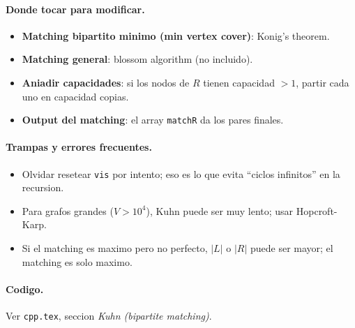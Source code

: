 \paragraph{Donde tocar para modificar.}
\begin{itemize}\setlength\itemsep{0pt}
	\item \textbf{Matching bipartito minimo (min vertex cover)}: Konig's theorem.
	\item \textbf{Matching general}: blossom algorithm (no incluido).
	\item \textbf{Aniadir capacidades}: si los nodos de $R$ tienen capacidad $> 1$, partir cada uno en capacidad copias.
	\item \textbf{Output del matching}: el array \texttt{matchR} da los pares finales.
\end{itemize}

\paragraph{Trampas y errores frecuentes.}
\begin{itemize}\setlength\itemsep{0pt}
	\item Olvidar resetear \texttt{vis} por intento; eso es lo que evita ``ciclos infinitos'' en la recursion.
	\item Para grafos grandes ($V > 10^4$), Kuhn puede ser muy lento; usar Hopcroft-Karp.
	\item Si el matching es maximo pero no perfecto, $|L|$ o $|R|$ puede ser mayor; el matching es solo maximo.
\end{itemize}

\paragraph{Codigo.}
Ver \texttt{cpp.tex}, seccion \textit{Kuhn (bipartite matching)}.

\vspace{0.5em}
